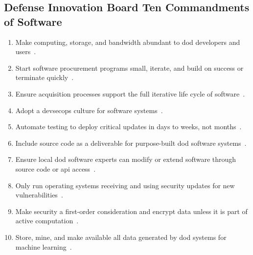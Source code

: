 \documentclass[../main.tex]{subfiles}
\begin{document}
\subsection{Defense Innovation Board Ten Commandments of Software}
\begin{enumerate}
  \item Make computing, storage, and bandwidth abundant to \ac{dod} developers and users~\autocite{edo-3-4-2-software-acquisition-management-2025}.
  \item Start software procurement programs small, iterate, and build on success or terminate quickly~\autocite{edo-3-4-2-software-acquisition-management-2025}.
  \item Ensure acquisition processes support the full iterative life cycle of software~\autocite{edo-3-4-2-software-acquisition-management-2025}.
  \item Adopt a \ac{devsecops} culture for software systems~\autocite{edo-3-4-2-software-acquisition-management-2025}.
  \item Automate testing to deploy critical updates in days to weeks, not months~\autocite{edo-3-4-2-software-acquisition-management-2025}.
  \item Include source code as a deliverable for purpose-built \ac{dod} software systems~\autocite{edo-3-4-2-software-acquisition-management-2025}.
  \item Ensure local \ac{dod} software experts can modify or extend software through source code or \ac{api} access~\autocite{edo-3-4-2-software-acquisition-management-2025}.
  \item Only run operating systems receiving and using security updates for new vulnerabilities~\autocite{edo-3-4-2-software-acquisition-management-2025}.
  \item Make security a first-order consideration and encrypt data unless it is part of active computation~\autocite{edo-3-4-2-software-acquisition-management-2025}.
  \item Store, mine, and make available all data generated by \ac{dod} systems for machine learning~\autocite{edo-3-4-2-software-acquisition-management-2025}.
\end{enumerate}
\end{document}
